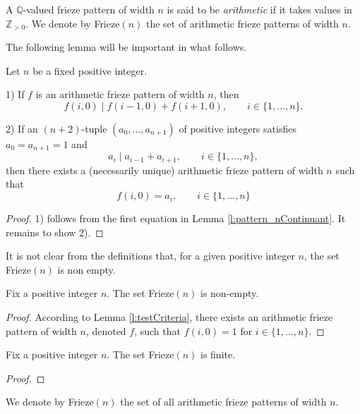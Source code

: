 \begin{definition}
    \label{def:arith-fp}
        A $\mathbb{Q}$-valued frieze pattern of width $n$ is said to be \textit{arithmetic} if it takes values in $\mathbb{Z}_{>0}$. 
        We denote by Frieze$(n)$ the set of arithmetic frieze patterns of width $n$. 
\end{definition}

The following lemma will be important in what follows. 
\begin{lemma}
    \label{l:testCriteria}
    Let $n$ be a fixed positive integer. 

    1) If $f$ is an arithmetic frieze pattern of width $n$, then
    \[
        f (i,0) \mid f (i-1,0) + f (i+1,0), \qquad i \in \{1, \ldots, n\}.
    \]

    2) If an $(n+2)$-tuple $(a_0, \ldots, a_{n+1})$ of positive integers satisfies $a_0 = a_{n+1} =1$ and 
    \[
        a_i \mid a_{i-1} + a_{i+1}, \qquad i \in \{1, \ldots, n\},
    \]
    then there exists a (necessarily unique) arithmetic frieze pattern of width $n$ such that 
    \[
        f(i,0) = a_i, \qquad i \in \{1, \ldots, n\}
    \]
\end{lemma}
\begin{proof}
    1) follows from the first equation in Lemma \ref{l:pattern_nContinuant}. It remains to show 2). 
\end{proof}

It is not clear from the definitions that, for a given positive integer $n$, the set Frieze$(n)$ is non empty.
\begin{lemma}
    \label{l:frieze-non-empty}
    Fix a positive integer $n$. The set Frieze$(n)$ is non-empty.
\end{lemma}
\begin{proof}
    According to Lemma \ref{l:testCriteria}, there exists an arithmetic frieze pattern of width $n$, denoted $f$, such 
    that $f (i,0) = 1$ for $i \in \{1,\ldots , n\}$. 
\end{proof}
\begin{proposition}
    \label{prop:frieze-finite}
    Fix a positive integer $n$. The set Frieze$(n)$ is finite. 
\end{proposition}
\begin{proof}

\end{proof}


\iffalse

    
    We denote by Frieze$(n)$ the set of all arithmetic frieze patterns of width $n$. 
    
